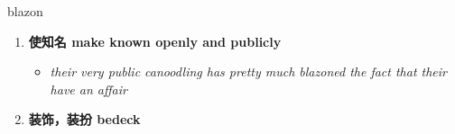 
\begin{frame}
{\huge blazon}
\begin{center}
\begin{enumerate}\Large
  \item \textbf{使知名 make known openly and publicly}
  \begin{itemize}
    \item \em{\Large{their very public canoodling has pretty much blazoned the fact that their have an affair}}
  \end{itemize}
  \item \textbf{装饰，装扮 bedeck}
\end{enumerate}
\end{center}
\end{frame}
